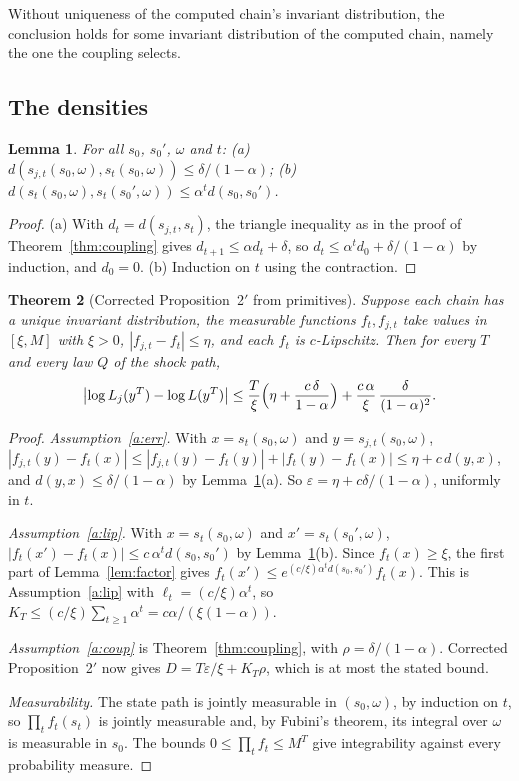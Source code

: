 \documentclass[11pt]{article}
\newtheorem{theorem}{Theorem}
\newtheorem{lemma}[theorem]{Lemma}
\theoremstyle{definition}
\theoremstyle{remark}
\begin{document}
\noindent Without uniqueness of the computed chain's invariant distribution, the conclusion holds
for some invariant distribution of the computed chain, namely the one the coupling selects.

\subsection{The densities}

\begin{lemma}\label{lem:paths}
For all $s_0$, $s_0'$, $\omega$ and $t$: (a) $d(s_{j,t}(s_0,\omega), s_t(s_0,\omega)) \le
\delta/(1-\alpha)$; (b) $d(s_t(s_0,\omega), s_t(s_0',\omega)) \le \alpha^t d(s_0,s_0')$.
\end{lemma}

\begin{proof}
(a) With $d_t = d(s_{j,t}, s_t)$, the triangle inequality as in the proof of
Theorem~\ref{thm:coupling} gives $d_{t+1} \le \alpha d_t + \delta$, so
$d_t \le \alpha^t d_0 + \delta/(1-\alpha)$ by induction, and $d_0 = 0$. (b) Induction on $t$ using
the contraction.
\end{proof}

\begin{theorem}[Corrected Proposition~2$'$ from primitives]\label{thm:prim}
Suppose each chain has a unique invariant distribution, the measurable functions $f_t, f_{j,t}$
take values in $[\xi, M]$ with $\xi > 0$, $|f_{j,t} - f_t| \le \eta$, and each $f_t$ is
$c$-Lipschitz. Then for every $T$ and every law $Q$ of the shock path,
\[
  \bigl|\log L_j(y^T) - \log L(y^T)\bigr| \le \frac{T}{\xi}\Bigl(\eta + \frac{c\,\delta}{1-\alpha}
  \Bigr) + \frac{c\,\alpha}{\xi}\,\frac{\delta}{(1-\alpha)^2}.
\]
\end{theorem}

\begin{proof}
\emph{Assumption~\ref{a:err}.} With $x = s_{t}(s_0,\omega)$ and $y = s_{j,t}(s_0,\omega)$,
$|f_{j,t}(y) - f_t(x)| \le |f_{j,t}(y) - f_t(y)| + |f_t(y) - f_t(x)| \le \eta + c\,d(y,x)$, and
$d(y,x) \le \delta/(1-\alpha)$ by Lemma~\ref{lem:paths}(a). So
$\varepsilon = \eta + c\delta/(1-\alpha)$, uniformly in $t$.

\emph{Assumption~\ref{a:lip}.} With $x = s_t(s_0,\omega)$ and $x' = s_t(s_0',\omega)$,
$|f_t(x') - f_t(x)| \le c\,\alpha^t d(s_0,s_0')$ by Lemma~\ref{lem:paths}(b). Since
$f_t(x) \ge \xi$, the first part of Lemma~\ref{lem:factor} gives
$f_t(x') \le e^{(c/\xi)\alpha^t d(s_0,s_0')}f_t(x)$. This is Assumption~\ref{a:lip} with
$\ell_t = (c/\xi)\alpha^t$, so $K_T \le (c/\xi)\sum_{t\ge1}\alpha^t = c\alpha/(\xi(1-\alpha))$.

\emph{Assumption~\ref{a:coup}} is Theorem~\ref{thm:coupling}, with $\rho = \delta/(1-\alpha)$.
Corrected Proposition~2$'$ now gives
$D = T\varepsilon/\xi + K_T\rho$, which is at most the stated bound.

\emph{Measurability.} The state path is jointly measurable in $(s_0,\omega)$, by induction on $t$,
so $\prod_t f_t(s_t)$ is jointly measurable and, by Fubini's theorem, its integral over $\omega$ is
measurable in $s_0$. The bounds $0 \le \prod_t f_t \le M^T$ give integrability against every
probability measure.
\end{proof}
\end{document}
